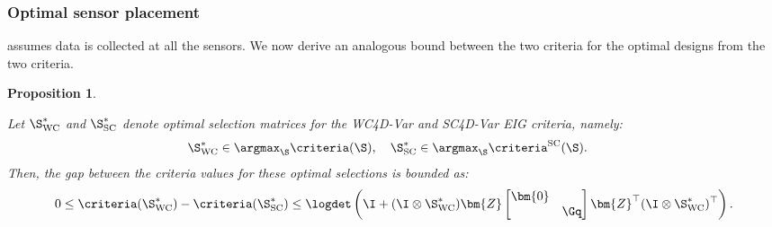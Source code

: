 \documentclass{aims} %
\newtheorem{proposition}[theorem]{Proposition}
\theoremstyle{definition}
\begin{document}
\subsubsection*{Optimal sensor placement}
assumes data is collected at all the sensors. We now derive an analogous bound between the two criteria for the optimal designs from the two criteria. 
%
\begin{proposition}\label{proposition:SCandWCoptCriteriaGap}


Let \( \S^*_\text{WC} \) and \( \S^*_\text{SC} \) denote  optimal selection matrices for the WC4D-Var and SC4D-Var EIG criteria, namely:
\begin{align}
    \S^*_\text{WC} &\in \argmax_{\S} \criteria(\S), \quad
    \S^*_\text{SC} \in \argmax_{\S} \criteria^\text{SC}(\S).
\end{align}
Then, the gap between the criteria values for these optimal selections is bounded as:
\begin{align*}
    0\leq \criteria(\S^*_\text{WC}) - \criteria(\S^*_\text{SC}) \leq \logdet \left( \I + (\I \otimes \S^*_\text{WC})\bm{Z} 
    \begin{bmatrix}
    \bm{0} & \\
    & \Gq
    \end{bmatrix} 
    \bm{Z}^\top (\I \otimes \S^*_\text{WC})^\top \right).
\end{align*}

\end{proposition}
\end{document}
